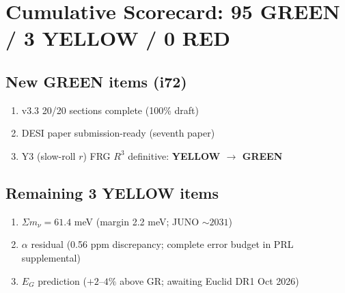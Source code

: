 \documentclass[11pt,a4paper]{article}
\begin{document}
\section{Cumulative Scorecard: 95 GREEN / 3 YELLOW / 0 RED}

\subsection{New GREEN items (i72)}
\begin{enumerate}[nosep]
\item v3.3 20/20 sections complete (100\% draft)
\item DESI paper submission-ready (seventh paper)
\item Y3 (slow-roll $r$) FRG $R^3$ definitive: \textbf{YELLOW $\to$ GREEN}
\end{enumerate}

\subsection{Remaining 3 YELLOW items}
\begin{enumerate}
\item $\Sigma m_\nu = 61.4$ meV (margin 2.2 meV; JUNO $\sim 2031$)
\item $\alpha$ residual (0.56 ppm discrepancy; complete error budget in PRL supplemental)
\item $E_G$ prediction ($+2$--$4\%$ above GR; awaiting Euclid DR1 Oct 2026)
\end{enumerate}
\end{document}
